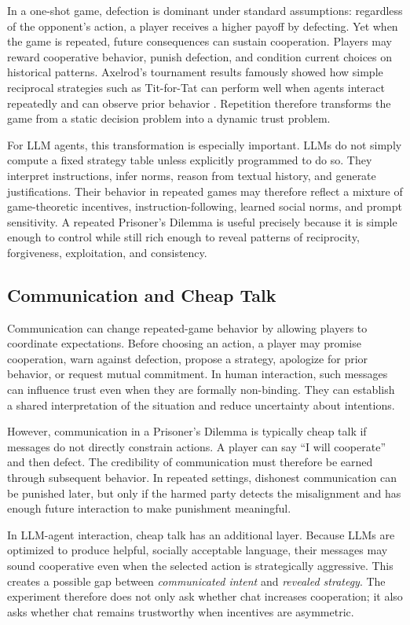 \documentclass[12pt,a4paper]{article}
\begin{document}
In a one-shot game, defection is dominant under standard assumptions: regardless of the opponent's action, a player receives a higher payoff by defecting. Yet when the game is repeated, future consequences can sustain cooperation. Players may reward cooperative behavior, punish defection, and condition current choices on historical patterns. Axelrod's tournament results famously showed how simple reciprocal strategies such as Tit-for-Tat can perform well when agents interact repeatedly and can observe prior behavior \cite{axelrod1984evolution}. Repetition therefore transforms the game from a static decision problem into a dynamic trust problem.

For LLM agents, this transformation is especially important. LLMs do not simply compute a fixed strategy table unless explicitly programmed to do so. They interpret instructions, infer norms, reason from textual history, and generate justifications. Their behavior in repeated games may therefore reflect a mixture of game-theoretic incentives, instruction-following, learned social norms, and prompt sensitivity. A repeated Prisoner's Dilemma is useful precisely because it is simple enough to control while still rich enough to reveal patterns of reciprocity, forgiveness, exploitation, and consistency.

\subsection{Communication and Cheap Talk}

Communication can change repeated-game behavior by allowing players to coordinate expectations. Before choosing an action, a player may promise cooperation, warn against defection, propose a strategy, apologize for prior behavior, or request mutual commitment. In human interaction, such messages can influence trust even when they are formally non-binding. They can establish a shared interpretation of the situation and reduce uncertainty about intentions.

However, communication in a Prisoner's Dilemma is typically cheap talk if messages do not directly constrain actions. A player can say ``I will cooperate'' and then defect. The credibility of communication must therefore be earned through subsequent behavior. In repeated settings, dishonest communication can be punished later, but only if the harmed party detects the misalignment and has enough future interaction to make punishment meaningful.

In LLM-agent interaction, cheap talk has an additional layer. Because LLMs are optimized to produce helpful, socially acceptable language, their messages may sound cooperative even when the selected action is strategically aggressive. This creates a possible gap between \emph{communicated intent} and \emph{revealed strategy}. The experiment therefore does not only ask whether chat increases cooperation; it also asks whether chat remains trustworthy when incentives are asymmetric.
\end{document}
